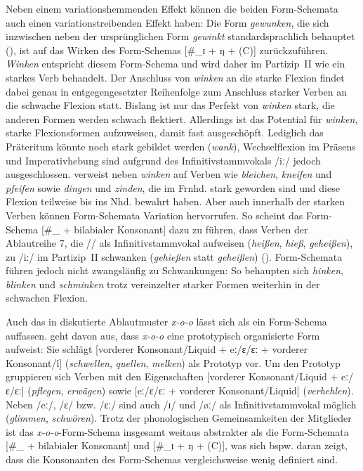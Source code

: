 Neben einem variationshemmenden Effekt können die beiden Form-Schemata auch einen varia\-tionstreibenden Effekt haben: Die Form \textit{gewunken}, die sich inzwischen neben der ursprünglichen Form \textit{gewinkt} standardsprachlich behauptet (\cite{Duden.2020}), ist auf das Wirken des Form-Schemas [\#\_ɪ + ŋ + (C)]  zurückzuführen. \textit{Winken} entspricht diesem Form-Schema und wird daher im Partizip~II wie ein starkes Verb behandelt. Der Anschluss von \textit{winken} an die starke Flexion findet dabei genau in entgegengesetzter Reihenfolge zum Anschluss starker Verben an die schwache Flexion statt. Bislang ist nur das Perfekt von \textit{winken} stark, die anderen Formen werden schwach flektiert. Allerdings ist das Potential für \textit{winken}, starke Flexionsformen aufzuweisen, damit fast ausgeschöpft. Lediglich das Präteritum könnte noch stark gebildet werden (\textit{wank}), Wechselflexion im Präsens und Imperativhebung sind aufgrund des Infinitivstammvokals /iː/ jedoch ausgeschlossen. \textcite[56]{Kopcke.1999} verweist neben \textit{winken} auf Verben wie \textit{bleichen}, \textit{kneifen} und \textit{pfeifen} sowie \textit{dingen} und \textit{zinden}, die im Frnhd. stark geworden sind und diese Flexion teilweise bis ins Nhd. bewahrt haben. Aber auch innerhalb der starken Verben können Form-Schemata Variation hervorrufen. So scheint das Form-Schema [\#\_{} + bilabialer Konsonant] dazu zu führen, dass Verben der Ablautreihe 7, die /{}/ als Infinitivstammvokal aufweisen (\textit{heißen}, \textit{hieß}, \textit{geheißen}), zu /iː/ im Partizip~II schwanken (\textit{gehießen} statt \textit{geheißen}) (\cite[171]{Nowak.2018}). Form-Schemata führen jedoch nicht zwangsläufig zu Schwankungen: So behaupten sich \textit{hinken}, \textit{blinken} und \textit{schminken} trotz vereinzelter starker Formen weiterhin in der schwachen Flexion.

Auch das in  diskutierte Ablautmuster \textit{x-o-o} lässt sich als ein Form-Schema auffassen. \textcite[169]{Nowak.2018} geht davon aus, dass \textit{x-o-o} eine prototypisch organisierte Form aufweist: Sie schlägt [vorderer Konsonant\slash Liquid + eː/ɛ/ɛː + vorderer Konsonant/l] (\textit{schwellen}, \textit{quellen}, \textit{melken}) als Prototyp vor. Um den Prototyp gruppieren sich Verben mit den Eigenschaften [vorderer Konsonant\slash Liquid + eː/ɛ/ɛː] (\textit{pflegen}, \textit{erwägen}) sowie [eː/ɛ/ɛː + vorderer Konsonant\slash Liquid] (\textit{verhehlen}). Neben /eː/, /ɛ/ bzw. /ɛː/  sind auch /ɪ/ und /øː/ als Infinitivstammvokal möglich (\textit{glimmen}, \textit{schwören}). Trotz der phonologischen Gemeinsamkeiten der Mitglieder ist das \textit{x-o-o}-Form-Schema insgesamt weitaus abstrakter als die Form-Schemata  [\#\_{} + bilabialer Konsonant] und [\#\_ɪ + ŋ + (C)], was sich bspw. daran zeigt, dass die Konsonanten des Form-Schemas vergleichsweise wenig definiert sind.




